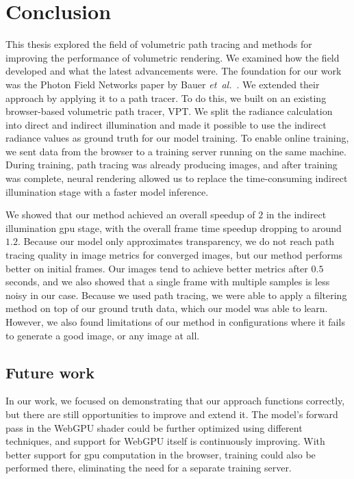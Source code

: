 \chapter{Conclusion}
\label{ch:conclusion}

This thesis explored the field of volumetric path tracing and methods for improving
the performance of volumetric rendering. We examined how the field developed and
what the latest advancements were. The foundation for our work was the Photon Field
Networks paper by Bauer \emph{et~al.}~\cite{bauer_photon_2024}. We extended their
approach by applying it to a path tracer. To do this, we built on an existing
browser-based volumetric path tracer, VPT. We split the radiance calculation into
direct and indirect illumination and made it possible to use the indirect radiance
values as ground truth for our model training. To enable online training, we sent
data from the browser to a training server running on the same machine. During
training, path tracing was already producing images, and after training was
complete, neural rendering allowed us to replace the time-consuming indirect
illumination stage with a faster model inference.

We showed that our method achieved an overall speedup of $2$ in the indirect
illumination \ac{gpu} stage, with the overall frame time speedup dropping to
around $1.2$. Because our model only approximates transparency, we do not reach
path tracing quality in image metrics for converged images, but our method
performs better on initial frames. Our images tend to achieve better metrics
after $0.5$ seconds, and we also showed that a single frame with multiple
samples is less noisy in our case. Because we used path tracing, we were able
to apply a filtering method on top of our ground truth data, which our model
was able to learn. However, we also found limitations of our method in
configurations where it fails to generate a good image, or any image at all.

\section{Future work}

In our work, we focused on demonstrating that our approach functions correctly,
but there are still opportunities to improve and extend it. The model’s forward
pass in the WebGPU shader could be further optimized using different techniques,
and support for WebGPU itself is continuously improving. With better support for
\ac{gpu} computation in the browser, training could also be performed there,
eliminating the need for a separate training server.

